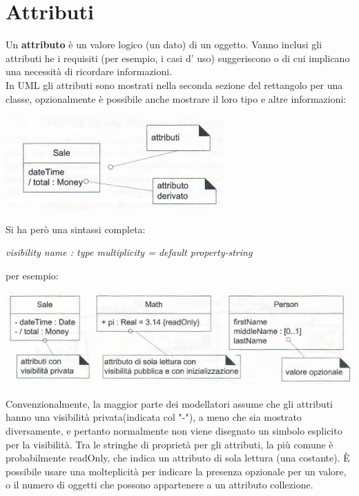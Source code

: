 \documentclass[a4paper,12pt, oneside]{book}
\begin{document}
\section{Attributi}
Un \textbf{attributo} è un valore logico (un dato) di un oggetto. Vanno inclusi gli attributi he i requisiti (per esempio, i casi d' uso) suggeriscono o di cui
implicano una necessità di ricordare informazioni.\\
In UML gli attributi sono mostrati nella seconda sezione del rettangolo per una classe, opzionalmente è possibile anche mostrare il loro tipo e altre informazioni:
\begin{center}
	\includegraphics[scale=0.7]{img/attd.png}
\end{center}
Si ha però una sintassi completa:
\begin{center}
	\textit{visibility name : type multiplicity = default { property-string }}
\end{center}
per esempio:
\begin{center}
	\includegraphics[scale=0.7]{img/attd2.png}
\end{center}
Convenzionalmente, la maggior parte dei modellatori assume che gli attributi hanno una visibilità privata(indicata col "-"), a meno che sia mostrato diversamente, e pertanto normalmente non viene disegnato un simbolo esplicito per la visibilità. Tra le stringhe di proprietà per gli attributi, la più comune è probabilmente {readOnly},
che indica un attributo di sola lettura (una costante). È possibile usare una molteplicità per indicare la presenza opzionale per un valore, o il numero di oggetti che possono appartenere a un attributo collezione.\\
\end{document}
